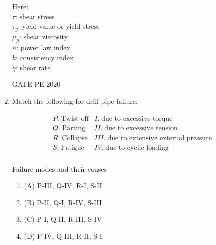 \documentclass[journal,12pt,onecolumn]{IEEEtran}
\theoremstyle{remark}
\begin{document}
\begin{enumerate}
Here: \\
$\tau$: shear stress \\
$\tau_y$: yield value or yield stress \\
$\mu_p$: shear viscosity \\
$n$: power law index \\
$k$: consistency index \\
$\dot{\gamma}$: shear rate \\
 \begin{enumerate}  \end{enumerate}

  \hfill{GATE PE 2020}
 
\item Match the following for drill pipe failure:

\begin{table}[h!]
\centering
\begin{align}
\begin{array}{ll}
P.\; \text{Twist off} & I.\; \text{due to excessive torque} \\
Q.\; \text{Parting}   & II.\; \text{due to excessive tension} \\
R.\; \text{Collapse}  & III.\; \text{due to extensive external pressure} \\
S.\; \text{Fatigue}   & IV.\; \text{due to cyclic loading} \\
\end{array}
\end{align}
\caption{Failure modes and their causes}
\label{tab:failures}
\end{table}


\begin{multicols}{2}
\begin{enumerate}
\item (A) P-III, Q-IV, R-I, S-II
\item (B) P-II, Q-I, R-IV, S-III
\item (C) P-I, Q-II, R-III, S-IV
\item (D) P-IV, Q-III, R-II, S-I
\end{enumerate}
\end{multicols}



\end{enumerate}
\end{document}

